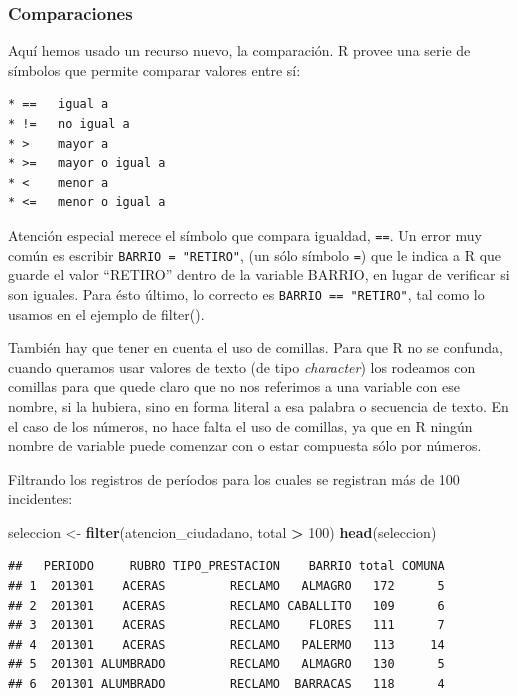 \documentclass[]{book}
\newenvironment{Shaded}{\begin{snugshade}}{\end{snugshade}}
\newcommand{\KeywordTok}[1]{\textcolor[rgb]{0.13,0.29,0.53}{\textbf{#1}}}
\newcommand{\DecValTok}[1]{\textcolor[rgb]{0.00,0.00,0.81}{#1}}
\newcommand{\StringTok}[1]{\textcolor[rgb]{0.31,0.60,0.02}{#1}}
\newcommand{\OperatorTok}[1]{\textcolor[rgb]{0.81,0.36,0.00}{\textbf{#1}}}
\newcommand{\NormalTok}[1]{#1}
\begin{document}
\subsubsection{Comparaciones}\label{comparaciones}

Aquí hemos usado un recurso nuevo, la comparación. R provee una serie de
símbolos que permite comparar valores entre sí:

\begin{verbatim}
* ==   igual a 
* !=   no igual a 
* >    mayor a 
* >=   mayor o igual a 
* <    menor a 
* <=   menor o igual a 
\end{verbatim}

Atención especial merece el símbolo que compara igualdad, \texttt{==}.
Un error muy común es escribir \texttt{BARRIO\ =\ "RETIRO"}, (un sólo
símbolo \texttt{=}) que le indica a R que guarde el valor ``RETIRO''
dentro de la variable BARRIO, en lugar de verificar si son iguales. Para
ésto último, lo correcto es \texttt{BARRIO\ ==\ "RETIRO"}, tal como lo
usamos en el ejemplo de filter().

También hay que tener en cuenta el uso de comillas. Para que R no se
confunda, cuando queramos usar valores de texto (de tipo
\emph{character}) los rodeamos con comillas para que quede claro que no
nos referimos a una variable con ese nombre, si la hubiera, sino en
forma literal a esa palabra o secuencia de texto. En el caso de los
números, no hace falta el uso de comillas, ya que en R ningún nombre de
variable puede comenzar con o estar compuesta sólo por números.

Filtrando los registros de períodos para los cuales se registran más de
100 incidentes:

\begin{Shaded}
\begin{Highlighting}[]
\NormalTok{seleccion <-}\StringTok{ }\KeywordTok{filter}\NormalTok{(atencion_ciudadano, total }\OperatorTok{>}\StringTok{ }\DecValTok{100}\NormalTok{)}
\KeywordTok{head}\NormalTok{(seleccion)}
\end{Highlighting}
\end{Shaded}

\begin{verbatim}
##   PERIODO     RUBRO TIPO_PRESTACION    BARRIO total COMUNA
## 1  201301    ACERAS         RECLAMO   ALMAGRO   172      5
## 2  201301    ACERAS         RECLAMO CABALLITO   109      6
## 3  201301    ACERAS         RECLAMO    FLORES   111      7
## 4  201301    ACERAS         RECLAMO   PALERMO   113     14
## 5  201301 ALUMBRADO         RECLAMO   ALMAGRO   130      5
## 6  201301 ALUMBRADO         RECLAMO  BARRACAS   118      4
\end{verbatim}
\end{document}
